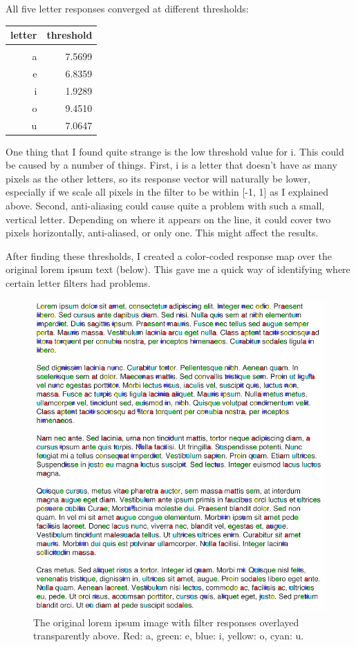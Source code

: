 \documentclass{article}
\begin{document}
All five letter responses converged at different thresholds:

\begin{tabular}{r | r}
    letter & threshold \\
    \hline             \\
         a &    7.5699 \\
         e &    6.8359 \\
         i &    1.9289 \\
         o &    9.4510 \\
         u &    7.0647
\end{tabular}

One thing that I found quite strange is the low threshold value for i. This 
could be caused by a number of things. First, i is a letter that doesn't have as 
many pixels as the other letters, so its response vector will naturally be lower, 
especially if we scale all pixels in the filter to be within [-1, 1] as I 
explained above. Second, anti-aliasing could cause quite a problem with 
such a small, vertical letter. Depending on where it appears on the line, it could 
cover two pixels horizontally, anti-aliased, or only one. This might affect the results.

After finding these thresholds, I created a color-coded response map over the 
original lorem ipsum text (below). This gave me a quick way of identifying where 
certain letter filters had problems.

\begin{figure}[!ht]
	\centering
	\includegraphics[width=160mm]{figs/lorem_ipsum_colors.png}
	\caption{The original lorem ipsum image with filter responses overlayed 
        transparently above. Red: a, green: e, blue: i, yellow: o, cyan: u.}
\end{figure}
\end{document}
